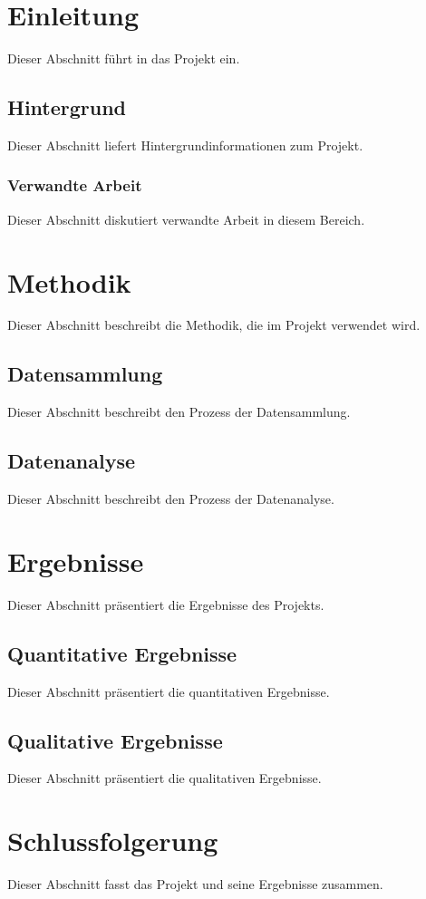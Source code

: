 \documentclass{article}
\begin{document}
\newpage
\tableofcontents
\newpage


\section{Einleitung}
Dieser Abschnitt führt in das Projekt ein.

\subsection{Hintergrund}
Dieser Abschnitt liefert Hintergrundinformationen zum Projekt.

\subsubsection{Verwandte Arbeit}
Dieser Abschnitt diskutiert verwandte Arbeit in diesem Bereich.

\section{Methodik}
Dieser Abschnitt beschreibt die Methodik, die im Projekt verwendet wird.

\subsection{Datensammlung}
Dieser Abschnitt beschreibt den Prozess der Datensammlung.

\subsection{Datenanalyse}
Dieser Abschnitt beschreibt den Prozess der Datenanalyse.

\section{Ergebnisse}
Dieser Abschnitt präsentiert die Ergebnisse des Projekts.

\subsection{Quantitative Ergebnisse}
Dieser Abschnitt präsentiert die quantitativen Ergebnisse.

\subsection{Qualitative Ergebnisse}
Dieser Abschnitt präsentiert die qualitativen Ergebnisse.

\section{Schlussfolgerung}
Dieser Abschnitt fasst das Projekt und seine Ergebnisse zusammen.
\end{document}

